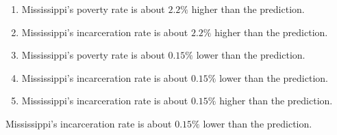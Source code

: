 \ifactodd
	\begin{enumerate}[label=\textbf{\Alph*.},itemsep=\fill,align=left]
		\item Mississippi's poverty rate is about $2.2\%$ higher than the prediction.
		\item Mississippi's incarceration rate is about $2.2\%$ higher than the prediction.
		\item Mississippi's poverty rate is about $0.15\%$ lower than the prediction.
		\item Mississippi's incarceration rate is about $0.15\%$ lower than the prediction. %
		\item Mississippi's incarceration rate is about $0.15\%$ higher than the prediction.
	\end{enumerate}
\else
\fi

\ifgridin
 Mississippi's incarceration rate is about $0.15\%$ lower than the prediction. %
		
\else
\fi

